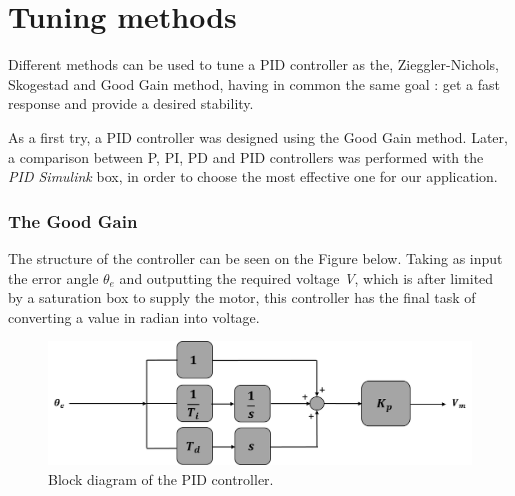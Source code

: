 \section{Tuning methods}
Different methods can be used to tune a PID controller as the, Zieggler-Nichols, Skogestad and Good Gain method, having in common the same goal : get a fast response and provide a desired stability.\par
As a first try, a PID controller was designed using the Good Gain method. Later, a comparison between P, PI, PD and PID controllers was performed with the \emph{PID Simulink} box, in order to choose the most effective one for our application.\par 	

\subsubsection{The Good Gain}


The structure of the controller can be seen on the Figure below. Taking as input the error angle \textbf{$\theta_{e}$} and outputting the required voltage \textit{V}, which is after limited by a saturation box to supply the motor, this controller has the final task of converting a value in radian into voltage.\par

\begin{figure}[H]
  \centering
  \includegraphics[scale=0.6]{figures/controller_model.png}
  \caption[LABEL] {Block diagram of the PID controller.}
\end{figure}
  

